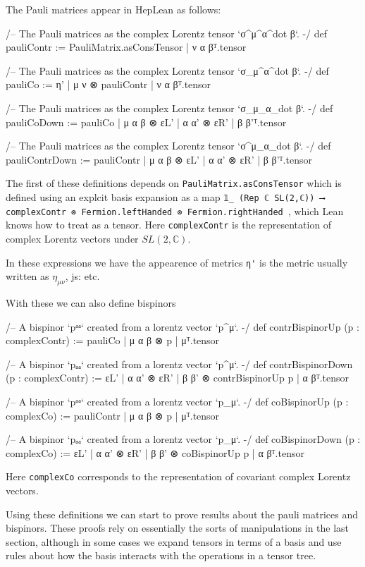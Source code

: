 \documentclass[a4paper, 11pt]{article}
\newcommand{\js}[1]{ {\color{magenta} js:  #1}}
\begin{document}
The Pauli matrices appear in HepLean as follows:
\begin{code}
/-- The Pauli matrices as the complex Lorentz tensor `σ^μ^α^{dot β}`. -/
def pauliContr := {PauliMatrix.asConsTensor | ν α β}ᵀ.tensor

/-- The Pauli matrices as the complex Lorentz tensor `σ_μ^α^{dot β}`. -/
def pauliCo := {η' | μ ν ⊗ pauliContr | ν α β}ᵀ.tensor

/-- The Pauli matrices as the complex Lorentz tensor `σ_μ_α_{dot β}`. -/
def pauliCoDown := {pauliCo | μ α β ⊗ εL' | α α' ⊗ εR' | β β'}ᵀ.tensor

/-- The Pauli matrices as the complex Lorentz tensor `σ^μ_α_{dot β}`. -/
def pauliContrDown := {pauliContr | μ α β ⊗ εL' | α α' ⊗ εR' | β β'}ᵀ.tensor
\end{code}
The first of these definitions depends on \lstinline|PauliMatrix.asConsTensor| which is defined 
using an explcit basis expansion as a map \lstinline|𝟙_ (Rep ℂ SL(2,ℂ)) ⟶ complexContr ⊗ Fermion.leftHanded ⊗ Fermion.rightHanded |, which Lean 
knows how to treat as a tensor. Here \lstinline|complexContr| is the representation of complex Lorentz vectors 
under $SL(2, \mathbb{C})$.

In these expressions we have the appearence of metrics \lstinline|η'| is the metric usually written as 
$\eta_{\mu \nu}$, \js{etc.}

With these we can also define bispinors 
\begin{code}
/-- A bispinor `pᵃᵃ` created from a lorentz vector `p^μ`. -/
def contrBispinorUp (p : complexContr) :=
  {pauliCo | μ α β ⊗ p | μ}ᵀ.tensor

/-- A bispinor `pₐₐ` created from a lorentz vector `p^μ`. -/
def contrBispinorDown (p : complexContr) :=
  {εL' | α α' ⊗ εR' | β β' ⊗ contrBispinorUp p | α β}ᵀ.tensor

/-- A bispinor `pᵃᵃ` created from a lorentz vector `p_μ`. -/
def coBispinorUp (p : complexCo) := {pauliContr | μ α β ⊗ p | μ}ᵀ.tensor

/-- A bispinor `pₐₐ` created from a lorentz vector `p_μ`. -/
def coBispinorDown (p : complexCo) :=
  {εL' | α α' ⊗ εR' | β β' ⊗ coBispinorUp p | α β}ᵀ.tensor
\end{code}
Here  \lstinline|complexCo| corresponds to the representation of covariant complex Lorentz vectors.

Using these definitions we can start to prove results about the pauli matrices and bispinors. 
These proofs rely on essentially the sorts of manipulations in the last section, although in some cases 
we expand tensors in terms of a basis and use rules about how the basis interacts with the operations in a tensor tree. 
\end{document}
